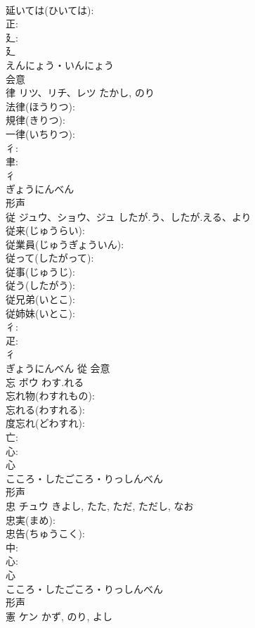 \documentclass[8pt]{extreport}
\begin{document}
\begin{CJK}{UTF8}{min}
\\	延いては(ひいては): 
\\	正: 
\\	廴: 
\\	廴	
\\	えんにょう・いんにょう	
\\	会意 
\\	律	リツ、リチ、レツ		たかし, のり	
\\	法律(ほうりつ): 
\\	規律(きりつ): 
\\	一律(いちりつ): 
\\	彳: 
\\	聿: 
\\	彳	
\\	ぎょうにんべん	
\\	形声 
\\	従	ジュウ、ショウ、ジュ	したが.う、したが.える、より		
\\	従来(じゅうらい): 
\\	従業員(じゅうぎょういん): 
\\	従って(したがって): 
\\	従事(じゅうじ): 
\\	従う(したがう): 
\\	従兄弟(いとこ): 
\\	従姉妹(いとこ): 
\\	彳: 
\\	疋: 
\\	彳	
\\	ぎょうにんべん	從	会意 
\\	忘	ボウ	わす.れる		
\\	忘れ物(わすれもの): 
\\	忘れる(わすれる): 
\\	度忘れ(どわすれ): 
\\	亡: 
\\	心: 
\\	心	
\\	こころ・したごころ・りっしんべん	
\\	形声 
\\	忠	チュウ		きよし, たた, ただ, ただし, なお	
\\	忠実(まめ): 
\\	忠告(ちゅうこく): 
\\	中: 
\\	心: 
\\	心	
\\	こころ・したごころ・りっしんべん	
\\	形声 
\\	憲	ケン		かず, のり, よし	

\end{CJK}
\end{document}

